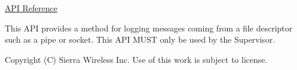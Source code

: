 \hyperlink{log_fd__interface_8h}{A\+P\+I Reference}

This A\+P\+I provides a method for logging messages coming from a file descriptor such as a pipe or socket. This A\+P\+I M\+U\+S\+T only be used by the Supervisor.





Copyright (C) Sierra Wireless Inc. Use of this work is subject to license. 